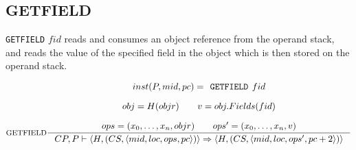 \subsection{GETFIELD}
\texttt{GETFIELD} $fid$ reads and consumes an object reference from the operand stack, and reads the value of the specified field in the object which is then stored on the operand stack. 

$$\inference[GETFIELD]{
inst(P,mid, pc) = \texttt{GETFIELD }fid \semnl\\
obj = H(objr) \semsp
v = obj.Fields(fid)\semnl \\
ops = (x_0, \ldots, x_n, objr) \semsp ops' = (x_0, \ldots, x_n, v)}
{CP, P \vdash \langle H, (CS, \langle mid, loc, ops, pc \rangle )\rangle \Rightarrow \langle H, (CS, \langle mid, loc, ops', pc + 2 \rangle )\rangle}$$
